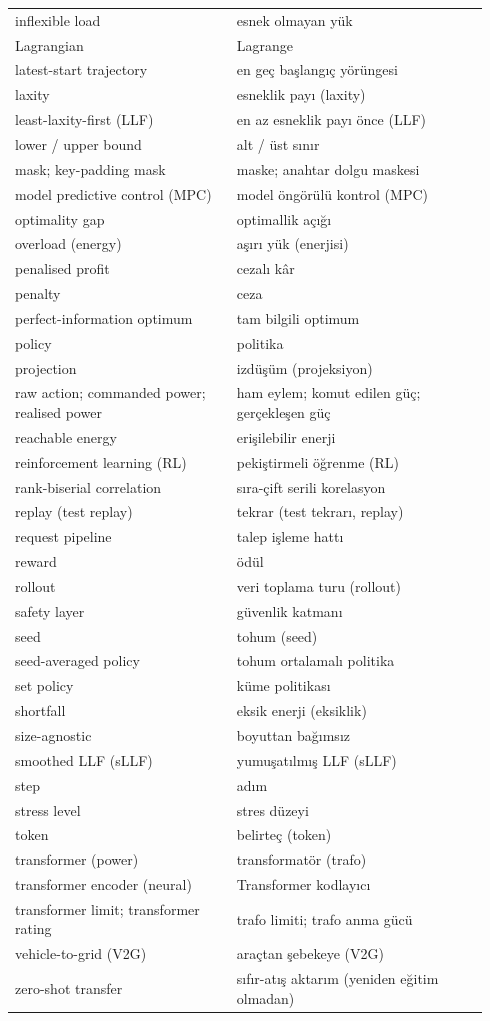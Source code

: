 {\begin{longtable}{@{}>{\raggedright}p{0.44\linewidth}>{\raggedright\arraybackslash}p{0.50\linewidth}@{}}
inflexible load & esnek olmayan yük \\
Lagrangian & Lagrange \\
latest-start trajectory & en geç başlangıç yörüngesi \\
laxity & esneklik payı (laxity) \\
least-laxity-first (LLF) & en az esneklik payı önce (LLF) \\
lower / upper bound & alt / üst sınır \\
mask; key-padding mask & maske; anahtar dolgu maskesi \\
model predictive control (MPC) & model öngörülü kontrol (MPC) \\
optimality gap & optimallik açığı \\
overload (energy) & aşırı yük (enerjisi) \\
penalised profit & cezalı kâr \\
penalty & ceza \\
perfect-information optimum & tam bilgili optimum \\
policy & politika \\
projection & izdüşüm (projeksiyon) \\
raw action; commanded power; realised power & ham eylem; komut edilen güç; gerçekleşen güç \\
reachable energy & erişilebilir enerji \\
reinforcement learning (RL) & pekiştirmeli öğrenme (RL) \\
rank-biserial correlation & sıra-çift serili korelasyon \\
replay (test replay) & tekrar (test tekrarı, replay) \\
request pipeline & talep işleme hattı \\
reward & ödül \\
rollout & veri toplama turu (rollout) \\
safety layer & güvenlik katmanı \\
seed & tohum (seed) \\
seed-averaged policy & tohum ortalamalı politika \\
set policy & küme politikası \\
shortfall & eksik enerji (eksiklik) \\
size-agnostic & boyuttan bağımsız \\
smoothed LLF (sLLF) & yumuşatılmış LLF (sLLF) \\
step & adım \\
stress level & stres düzeyi \\
token & belirteç (token) \\
transformer (power) & transformatör (trafo) \\
transformer encoder (neural) & Transformer kodlayıcı \\
transformer limit; transformer rating & trafo limiti; trafo anma gücü \\
vehicle-to-grid (V2G) & araçtan şebekeye (V2G) \\
zero-shot transfer & sıfır-atış aktarım (yeniden eğitim olmadan) \\
\end{longtable}
}
